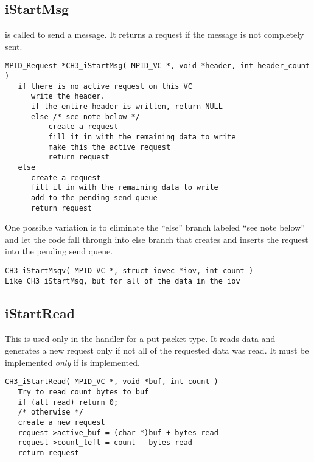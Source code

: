 \documentclass{article}
\begin{document}
\subsection{iStartMsg}
 is called to send a message.  It returns a
request if the message is 
not completely sent.

\begin{verbatim}
MPID_Request *CH3_iStartMsg( MPID_VC *, void *header, int header_count )
   if there is no active request on this VC
      write the header.
      if the entire header is written, return NULL
      else /* see note below */
          create a request
          fill it in with the remaining data to write
          make this the active request
          return request               
   else
      create a request
      fill it in with the remaining data to write
      add to the pending send queue
      return request
\end{verbatim}
One possible variation is to eliminate the ``else'' branch labeled ``see note
below'' and let the code fall through into else branch that creates and
inserts the request into the pending send queue.

\begin{verbatim}
CH3_iStartMsgv( MPID_VC *, struct iovec *iov, int count )
Like CH3_iStartMsg, but for all of the data in the iov
\end{verbatim}

\subsection{iStartRead}
This is used only in the handler for a put packet type.  It reads data and
generates a new request only if not all of the requested data was
read.
It must be implemented \emph{only} if  is implemented.

\begin{verbatim}
CH3_iStartRead( MPID_VC *, void *buf, int count )
   Try to read count bytes to buf
   if (all read) return 0;
   /* otherwise */
   create a new request
   request->active_buf = (char *)buf + bytes read
   request->count_left = count - bytes read
   return request
\end{verbatim}
\end{document}
